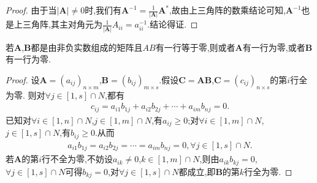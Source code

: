 \documentclass[lang=cn,newtx,10pt,scheme=chinese]{elegantbook}
\begin{document}
\begin{proof}
由于当$\left| \boldsymbol{A} \right|\ne 0$时,我们有$\boldsymbol{A}^{-1}=\frac{1}{\left| \boldsymbol{A} \right|}\boldsymbol{A}^*$,故由上三角阵的数乘结论可知,$\boldsymbol{A}^{-1}$也是上三角阵,其主对角元为$\frac{1}{\left| \boldsymbol{A} \right|}A_{ii}=a_{ii}^{-1}$.结论得证.
\end{proof}

\begin{proposition}
若\(\boldsymbol{A}\),\(\boldsymbol{B}\)都是由非负实数组成的矩阵且\(AB\)有一行等于零,则或者\(\boldsymbol{A}\)有一行为零,或者\(\boldsymbol{B}\)有一行为零.
\end{proposition}
\begin{proof}
设\(\boldsymbol{A} = (a_{ij})_{n\times m}\),\(\boldsymbol{B} = (b_{ij})_{m\times s}\).假设\(\boldsymbol{C} = \boldsymbol{AB}\),\(\boldsymbol{C} = (c_{ij})_{n\times s}\)的第\(i\)行全为零.
则对\(\forall j\in [1,s]\cap N\),都有
\begin{align*}
c_{ij} = a_{i1}b_{1j} + a_{i2}b_{2j} + \cdots + a_{im}b_{nj} = 0 .
\end{align*}
已知对\(\forall i\in [1,n]\cap N\),\(j\in [1,m]\cap N\),有\(a_{ij} \geq 0\);对\(\forall i\in [1,m]\cap N\),\(j\in [1,s]\cap N\),有\(b_{ij} \geq 0\).从而
\begin{align*}
a_{i1}b_{1j} = a_{i2}b_{2j} = \cdots = a_{im}b_{nj} = 0,\forall j\in [1,s]\cap N.
\end{align*}
若\(\boldsymbol{A}\)的第\(i\)行不全为零,不妨设\(a_{ik} \neq 0\),\(k\in [1,m]\cap N\),则由\(a_{ik}b_{kj} = 0\),\(\forall j\in [1,s]\cap N\)可得\(b_{kj} = 0\),对\(\forall j\in [1,s]\cap N\)都成立,即\(\boldsymbol{B}\)的第\(k\)行全为零. 
\end{proof}
\end{document}
